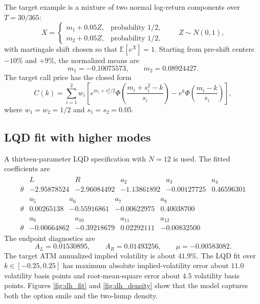 \documentclass[11pt]{article}
\newcommand{\E}{\mathbb{E}}
\newcommand{\1}{\mathbf{1}}
\newcommand{\PhiN}{\Phi}
\begin{document}
The target example is a mixture of two normal log-return components over $T=30/365$:
\begin{equation}
    X=\begin{cases}
       m_1+0.05 Z, & \text{probability }1/2,\\
       m_2+0.05 Z, & \text{probability }1/2,
    \end{cases}
    \qquad Z\sim N(0,1),
\end{equation}
with martingale shift chosen so that $\E[e^X]=1$.  Starting from pre-shift centers $-10\%$ and $+9\%$, the normalized means are
\begin{equation}
    m_1=-0.10075573,
    \qquad
    m_2= 0.08924427.
\end{equation}
The target call price has the closed form
\begin{equation}
    C(k)=\sum_{i=1}^{2}w_i\left[
e^{m_i+s_i^2/2}\PhiN\left(\frac{m_i+s_i^2-k}{s_i}\right)
-e^k\PhiN\left(\frac{m_i-k}{s_i}\right)\right],\label{eq:mix_call}
\end{equation}
where $w_1=w_2=1/2$ and $s_1=s_2=0.05$.

\subsection{LQD fit with higher modes}

A thirteen-parameter LQD specification with $N=12$ is used.  The fitted coefficients are
\begin{equation}
\label{eq:dh_lqd_coeffs}
\begin{gathered}
\begin{array}{c|rrrrr}
 & L & R & a_2 & a_3 & a_4\\ \hline
\theta & -2.95878524 & -2.96084492 & -1.13861892 & -0.00127725 & 0.46596301
\end{array}\\[4pt]
\begin{array}{c|rrrr}
 & a_5 & a_6 & a_7 & a_8\\ \hline
\theta & 0.00265138 & -0.55916861 & -0.00622975 & 0.40038700
\end{array}\\[4pt]
\begin{array}{c|rrrr}
 & a_9 & a_{10} & a_{11} & a_{12}\\ \hline
\theta & -0.00664862 & -0.39218679 & 0.02292111 & -0.00832500
\end{array}
\end{gathered}
\end{equation}
The endpoint diagnostics are
\begin{equation}
    A_L=0.01530895,
    \qquad A_R=0.01493256,
    \qquad \mu=-0.00583082.
\end{equation}
The target ATM annualized implied volatility is about $41.9\%$.  The LQD fit over $k\in[-0.25,0.25]$ has maximum absolute implied-volatility error about $11.0$ volatility basis points and root-mean-square error about $4.5$ volatility basis points.  Figures \ref{fig:dh_fit} and \ref{fig:dh_density} show that the model captures both the option smile and the two-hump density.
\end{document}
